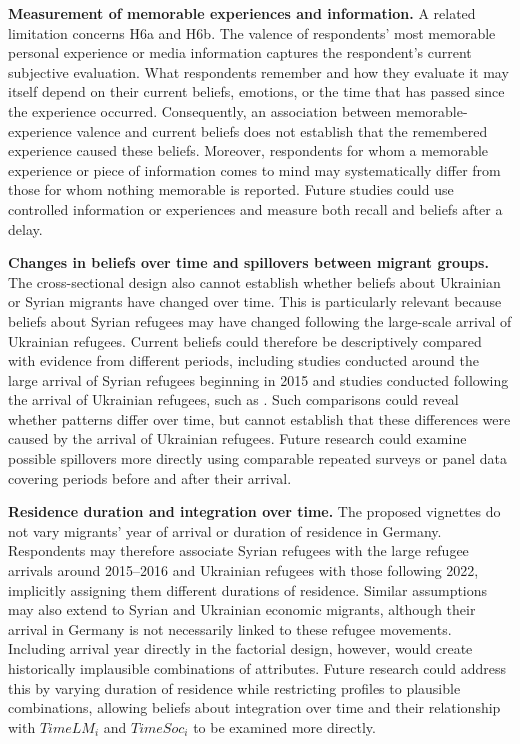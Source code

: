 \noindent\textbf{Measurement of memorable experiences and information.} A related limitation concerns H6a and H6b. The valence of respondents' most memorable personal experience or media information captures the respondent's current subjective evaluation. What respondents remember and how they evaluate it may itself depend on their current beliefs, emotions, or the time that has passed since the experience occurred. Consequently, an association between memorable-experience valence and current beliefs does not establish that the remembered experience caused these beliefs. Moreover, respondents for whom a memorable experience or piece of information comes to mind may systematically differ from those for whom nothing memorable is reported. Future studies could use controlled information or experiences and measure both recall and beliefs after a delay.\bigskip

\noindent\textbf{Changes in beliefs over time and spillovers between migrant groups.} The cross-sectional design also cannot establish whether beliefs about Ukrainian or Syrian migrants have changed over time. This is particularly relevant because beliefs about Syrian refugees may have changed following the large-scale arrival of Ukrainian refugees. Current beliefs could therefore be descriptively compared with evidence from different periods, including studies conducted around the large arrival of Syrian refugees beginning in 2015 and studies conducted following the arrival of Ukrainian refugees, such as \citet{moise2024european}. Such comparisons could reveal whether patterns differ over time, but cannot establish that these differences were caused by the arrival of Ukrainian refugees. Future research could examine possible spillovers more directly using comparable repeated surveys or panel data covering periods before and after their arrival.\bigskip

\noindent\textbf{Residence duration and integration over time.} The proposed vignettes do not vary migrants' year of arrival or duration of residence in Germany. Respondents may therefore associate Syrian refugees with the large refugee arrivals around 2015--2016 and Ukrainian refugees with those following 2022, implicitly assigning them different durations of residence. Similar assumptions may also extend to Syrian and Ukrainian economic migrants, although their arrival in Germany is not necessarily linked to these refugee movements. Including arrival year directly in the factorial design, however, would create historically implausible combinations of attributes. Future research could address this by varying duration of residence while restricting profiles to plausible combinations, allowing beliefs about integration over time and their relationship with \(TimeLM_i\) and \(TimeSoc_i\) to be examined more directly.\bigskip

